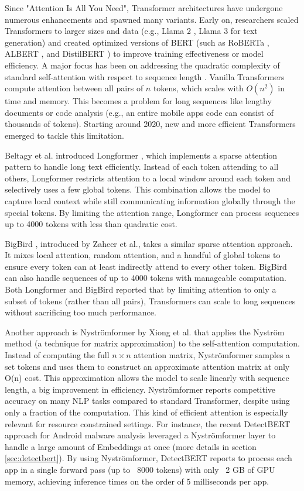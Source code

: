 Since "Attention Is All You Need", Transformer architectures have undergone numerous enhancements 
and spawned many variants. 
Early on, researchers scaled Transformers to larger sizes and data 
(e.g., Llama 2 \cite{llama2}, Llama 3 \cite{llama3} for text generation) and created optimized versions of BERT 
(such as RoBERTa \cite{roberta}, ALBERT \cite{albert}, and DistilBERT \cite{distilbert}) 
to improve training effectiveness or model efficiency. 
A major focus has been on addressing the quadratic complexity of standard self-attention with respect 
to sequence length \cite{nystromformer}. 
Vanilla Transformers compute attention between all pairs of $n$ tokens, 
which scales with $O(n^2)$ in time and memory. 
This becomes a problem for long sequences like lengthy documents or code analysis 
(e.g., an entire mobile apps code can consist of thousands of tokens). 
Starting around 2020, new and more efficient Transformers emerged to tackle this limitation.

Beltagy et al. introduced Longformer \cite{longformer}, 
which implements a sparse attention pattern to handle long text efficiently. 
Instead of each token attending to all others, 
Longformer restricts attention to a local window around each token and selectively uses a few 
global tokens. 
This combination allows the model to capture local context while still communicating information globally 
through the special tokens. 
By limiting the attention range, Longformer can process sequences up to 
4000 tokens with less than quadratic cost. 

BigBird \cite{bigbird}, introduced by Zaheer et al., 
takes a similar sparse attention approach. 
It mixes local attention, random attention, and a handful of global tokens to ensure every token can 
at least indirectly attend to every other token. 
BigBird can also handle sequences of up to 4000 tokens with manageable computation.
Both Longformer and BigBird reported that by limiting attention to only a subset of tokens 
(rather than all pairs), 
Transformers can scale to long sequences without sacrificing too much performance.

Another approach is Nyströmformer \cite{nystromformer} by Xiong et al. 
that applies the Nyström method (a technique for matrix approximation) to the self-attention computation.
Instead of computing the full $n \times n$ attention matrix, 
Nyströmformer samples a set tokens and uses them to construct an approximate attention matrix 
at only O(n) cost. 
This approximation allows the model to scale linearly with sequence length, 
a big improvement in efficiency. 
Nyströmformer reports competitive accuracy on many NLP tasks compared to 
standard Transformer, despite using only a fraction of the computation. 
This kind of efficient attention is especially relevant for resource constrained settings. 
For instance, the recent DetectBERT \cite{detectbert} approach for Android malware analysis 
leveraged a Nyströmformer layer to handle a large amount of Embeddings at once 
(more details in section \ref{sec:detectbert}). 
By using Nyströmformer, DetectBERT reports to process each app in a single forward pass (up to ~8000 tokens) 
with only ~2 GB of GPU memory, achieving inference times on the order of 5 milliseconds per app. 

